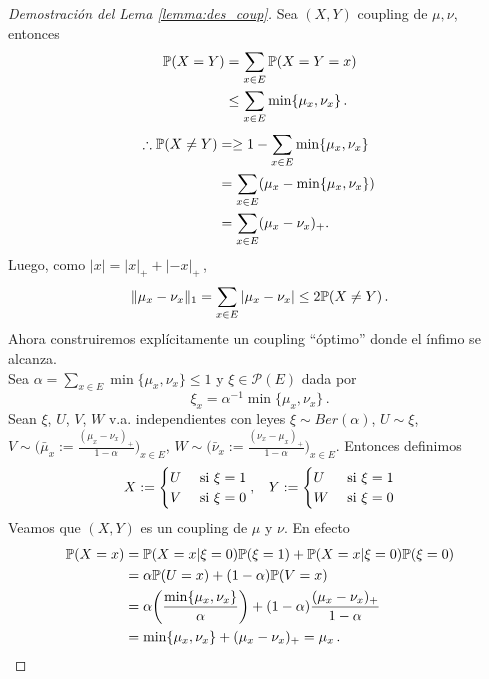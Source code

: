 \begin{proof}[Demostración del Lema \ref{lemma:des_coup}]  %
\gris Sea $(X,Y)$ coupling de $\mu,\nu$, entonces
\begin{alignat*}{2}
    \P(X=Y) & = \displaystyle\sum_{x\in E}\P(X=Y=x)  \\
     & \leq \displaystyle\sum_{x\in E}\min\{\mu_x,\nu_x\} \, .
\end{alignat*}
\begin{alignat*}{2}
    \therefore \P(X\neq Y) & = \geq 1-\displaystyle \sum_{x\in E}\min\{\mu_x,\nu_x\}  \\
     &  = \displaystyle \sum_{x\in E}(\mu_x-\min\{\mu_x,\nu_x\}) \, \\
     & = \displaystyle\sum_{x\in E}(\mu_x-\nu_x)_+.
\end{alignat*}
Luego, como $|x| = |x|_++|-x|_+$\,,
$$ \|\mu_x-\nu_x\|_1 = \displaystyle\sum_{x\in E}|\mu_x-\nu_x|\leq 2\P(X\neq Y) \, .$$
Ahora construiremos explícitamente un coupling ``óptimo'' donde el ínfimo se alcanza. \\ Sea $\alpha = \displaystyle\sum_{x\in E}\min\{\mu_x,\nu_x\}\leq 1$ y $\xi\in\mathcal{P}(E)$ dada por
$$ \xi_x = \alpha^{-1}\min\{\mu_x,\nu_x\}\, .$$
Sean $\xi$, $U$, $V$, $W$ v.a. independientes con leyes $\xi\sim Ber(\alpha)$, $U\sim\xi$, $V\sim\bigg(\bar{\mu}_x\displaystyle:=\frac{(\mu_x-\nu_x)_+}{1-\alpha}\bigg)_{x\in E}$, $W\sim\bigg(\bar{\nu}_x\displaystyle:=\frac{(\nu_x-\mu_x)_+}{1-\alpha}\bigg)_{x\in E}$. Entonces definimos
$$ X:=\begin{cases}
U & \mbox{ si }\xi=1\\
V & \mbox{ si }\xi=0
\end{cases}, \espacio Y:=\begin{cases}
U & \mbox{ si }\xi=1\\
W & \mbox{ si }\xi=0
\end{cases}$$
Veamos que $(X,Y)$ es un coupling de $\mu$ y $\nu$. En efecto
\begin{alignat*}{2}
    \P(X=x) & = \P(X=x|\xi=0)\P(\xi=1)+\P(X=x|\xi=0)\P(\xi=0) \\
     & = \alpha\P(U=x)+(1-\alpha)\P(V=x) \\
     & = \displaystyle \alpha\bigg(\frac{\min\{\mu_x,\nu_x\}}{\alpha}\bigg)+(1-\alpha)\frac{(\mu_x-\nu_x)_+}{1-\alpha} \\
     & = \min\{\mu_x,\nu_x\}+(\mu_x-\nu_x)_+ = \mu_x \, .
\end{alignat*}

\end{proof}
